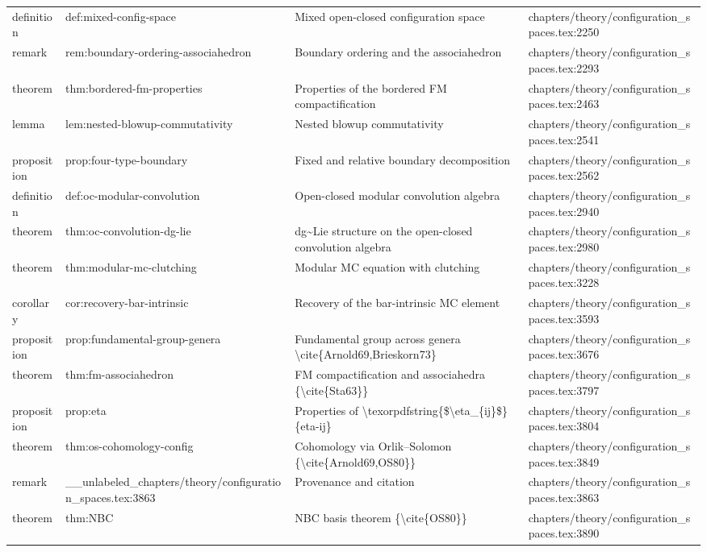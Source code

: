 \documentclass[11pt]{article}
\begin{document}
\begin{longtable}{L{0.10\textwidth}L{0.26\textwidth}L{0.42\textwidth}L{0.22\textwidth}}
definition & def:mixed-config-space & Mixed op{}en-closed configuration space & chapters/theory/configuration\_spaces.tex:2250\\
remark & rem:boundary-ordering-associahedron & Boundary ordering and the associahedron & chapters/theory/configuration\_spaces.tex:2293\\
theorem & thm:bordered-fm-properties & Properties of the bordered FM compactification & chapters/theory/configuration\_spaces.tex:2463\\
lemma & lem:nested-blowup-commutativity & Nested blowup commutativity & chapters/theory/configuration\_spaces.tex:2541\\
proposition & prop:four-type-boundary & Fixed and relative boundary decomposition & chapters/theory/configuration\_spaces.tex:2562\\
definition & def:oc-modular-convolution & Op{}en-closed modular convolution algebra & chapters/theory/configuration\_spaces.tex:2940\\
theorem & thm:oc-convolution-dg-lie & dg\textasciitilde{}Lie structure on the op{}en-closed convolution algebra & chapters/theory/configuration\_spaces.tex:2980\\
theorem & thm:modular-mc-clutching & Modular MC equation with clutching & chapters/theory/configuration\_spaces.tex:3228\\
corollary & cor:recovery-bar-intrinsic & Recovery of the bar-intrinsic MC element & chapters/theory/configuration\_spaces.tex:3593\\
proposition & prop:fundamental-group-genera & Fundamental group across genera \textbackslash{}cite\{Arnold69,Brieskorn73\} & chapters/theory/configuration\_spaces.tex:3676\\
theorem & thm:fm-associahedron & FM compactification and associahedra \{\textbackslash{}cite\{Sta63\}\} & chapters/theory/configuration\_spaces.tex:3797\\
proposition & prop:eta & Properties of \textbackslash{}texorpdfstring\{\$\textbackslash{}eta\_\{ij\}\$\}\{eta-ij\} & chapters/theory/configuration\_spaces.tex:3804\\
theorem & thm:os-cohomology-config & Cohomology via Orlik--Solomon \{\textbackslash{}cite\{Arnold69,OS80\}\} & chapters/theory/configuration\_spaces.tex:3849\\
remark & \_\_unlabeled\_chapters/theory/configuration\_spaces.tex:3863 & Provenance and citation & chapters/theory/configuration\_spaces.tex:3863\\
theorem & thm:NBC & NBC basis theorem \{\textbackslash{}cite\{OS80\}\} & chapters/theory/configuration\_spaces.tex:3890\\

\end{longtable}
\end{document}
